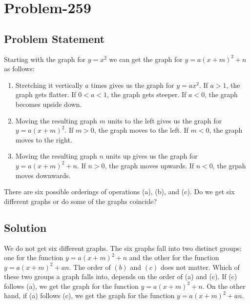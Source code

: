 \documentclass[12pt]{article}
\begin{document}
\section*{Problem-259}
\subsection*{Problem Statement}
Starting with the graph for $y = x^2$ we can get the graph for $y = a(x+m)^2 + n$ as follows:
\begin{enumerate}[label=(\alph*)]
	\item Stretching it vertically $a$ times gives us the graph for $y = ax^2$. If $a > 1$, the graph gets flatter. If $0 < a < 1$, the graph gets steeper. If $a < 0$, the graph becomes upside down.
	\item Moving the resulting graph $m$ units to the left gives us the graph for $y = a(x+m)^2$. If $m > 0$, the graph moves to the left. If $m < 0$, the graph moves to the right.
	\item Moving the resulting graph $n$ units up gives us the graph for $y = a(x+m)^2 + n$. If $n > 0$, the graph moves upwards. If $n < 0$, the grpah moves downwards.
\end{enumerate}

There are six possible orderings of operations (a), (b), and (c). Do we get six different graphs or do some of the graphs coincide?

\subsection*{Solution}
We do not get six different graphs. The six graphs fall into two distinct groups: one for the function $y = a(x+m)^2+n$ and the other for the function $y = a(x+m)^2+an$. The order of $(b)$ and $(c)$ does not matter. Which of these two groups a graph falls into, depends on the order of (a) and (c). If (c) follows (a), we get the graph for the function $y = a(x+m)^2+n$. On the other hand, if (a) follows (c), we get the graph for the function $y = a(x+m)^2+an$.
\end{document}
